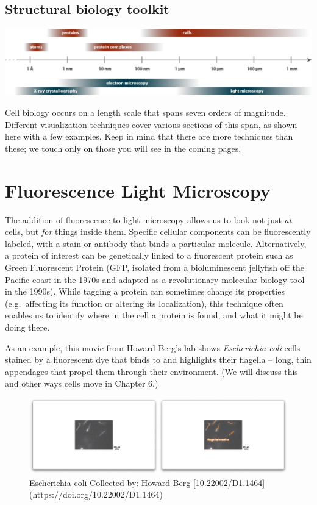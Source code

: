 \documentclass[]{tufte-book}
\begin{document}
\subsection{Structural biology
toolkit}\label{Structural_biology_toolkit}

\includegraphics{img/schematics/1_1_1}

Cell biology occurs on a length scale that spans seven orders of
magnitude. Different visualization techniques cover various sections of
this span, as shown here with a few examples. Keep in mind that there
are more techniques than these; we touch only on those you will see in
the coming pages.

\section{Fluorescence Light
Microscopy}\label{fluorescence-light-microscopy}

The addition of fluorescence to light microscopy allows us to look not
just \emph{at} cells, but \emph{for} things inside them. Specific
cellular components can be fluorescently labeled, with a stain or
antibody that binds a particular molecule. Alternatively, a protein of
interest can be genetically linked to a fluorescent protein such as
Green Fluorescent Protein (GFP, isolated from a bioluminescent jellyfish
off the Pacific coast in the 1970s and adapted as a revolutionary
molecular biology tool in the 1990s). While tagging a protein can
sometimes change its properties (e.g.~affecting its function or altering
its localization), this technique often enables us to identify where in
the cell a protein is found, and what it might be doing there.

As an example, this movie from Howard Berg's lab \citet{berg}
\citet{turner2000} shows \emph{Escherichia coli} cells stained by a
fluorescent dye that binds to and highlights their flagella -- long,
thin appendages that propel them through their environment. (We will
discuss this and other ways cells move in Chapter 6.)

\begin{figure}
\includegraphics{movie_stills/1_2} \caption[Escherichia coli Collected by]{Escherichia coli Collected by: Howard Berg [10.22002/D1.1464](https://doi.org/10.22002/D1.1464)}\label{fig:unnamed-chunk-4}
\end{figure}
\end{document}
